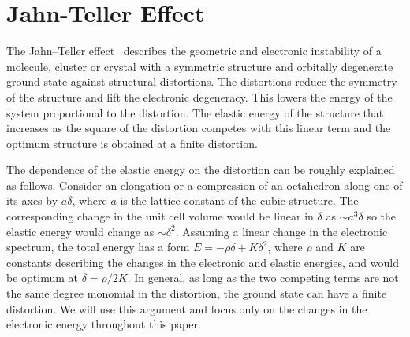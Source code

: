 \documentclass[a4paper,prb,twocolumn]{revtex4-1}  %
\newcommand{\com}[1]{}
\newcommand{\az}[1]{{\color{magenta}{#1}}} %
\begin{document}
\com{
$V_{oct}(\vec r)$ causes the d-orbitals to split into two manifolds,
$t_{2g}$  and $e_g$, where $t_{2g}$ contains three degenerate states ($xy,yz,zx$) while $e_g$ has two degenerate states ($x^2-y^2,z^2$).
The crystal field splitting between the two manifolds is
${\Delta=\frac{160}{3}\frac{q_o}{a} D_{4}}$.
\az{We will see how these degeneracies are lifted as we elongate (or compress)
the octahedron along a ....??}
}


\section{Jahn-Teller Effect}
\label{sec:JT}

The Jahn--Teller effect~\cite{Jahn-Teller} describes the 
geometric and electronic instability of a %
molecule, cluster or crystal with
a symmetric structure and orbitally degenerate ground state
against structural distortions.
The distortions  
reduce the symmetry of the structure
and lift the electronic degeneracy.
This lowers the energy of the system proportional to
the distortion.
The elastic energy of the structure that increases as the square of the distortion
competes with this linear term and the optimum structure 
is obtained at a finite distortion.


The dependence of the elastic energy on the distortion can be roughly explained
as follows.
Consider an 
elongation or a compression of an octahedron along one of its axes by $a\delta$,
where $a$ is the lattice constant of the cubic structure.
The corresponding change in the unit cell volume would be linear in $\delta$
as $\sim a^3 \delta$
so the elastic energy
would change as $\sim\delta^2$.
Assuming a linear change 
 in the electronic spectrum,
  the total energy has a form
$E=-\rho\delta + K \delta^2$, where $\rho$ and $K$ are constants 
describing the changes in the electronic and elastic energies,
and would be optimum at $\delta=\rho/2K$.
In general, as long as the two competing terms 
are not the same degree monomial in the distortion,
the ground state can have a finite distortion.
We will use this argument and focus only on the changes
 in the electronic energy throughout this paper.
\end{document}

